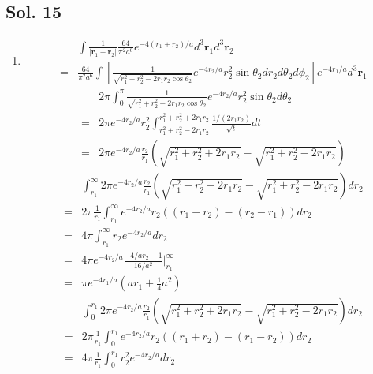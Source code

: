    \subsection*{Sol. 15}
   \begin{enumerate}
       \item 
       \begin{align*}
           &\int\frac{1}{|\bm r_1-\bm r_2|}
           \frac{64}{\pi^2 a^6}e^{-4(r_1+r_2)/a}d^3\bm r_1 d^3\bm r_2\\
           =&\frac{64}{\pi^2 a^6}
           \int\left[\frac{1}{\sqrt{r_1^2+r_2^2-2r_1r_2\cos\theta_2}} e^{-4r_2/a}r_2^2\sin\theta_2
           dr_2d\theta_2d\phi_2
           \right] e^{-4r_1/a}d^3\bm r_1
       \end{align*}
       \begin{align*}
           &2\pi\int_{0}^{\pi}
           \frac{1}{\sqrt{r_1^2+r_2^2-2r_1r_2\cos\theta_2}} e^{-4r_2/a}r_2^2\sin\theta_2
           d\theta_2\\
           =&
           2\pi e^{-4r_2/a}r_2^2\int_{r_1^2+r_2^2-2r_1r_2}^{r_1^2+r_2^2+2r_1r_2} \frac{1/(2r_1r_2)}{\sqrt{t}}dt\\
           =&2\pi e^{-4r_2/a}\frac{r_2}{r_1}
           \left(\sqrt{r_1^2+r_2^2+2r_1r_2} - \sqrt{r_1^2+r_2^2-2r_1r_2}\right)
       \end{align*}
       \begin{align*}
           &\int_{r_1}^{\infty}
           2\pi e^{-4r_2/a}\frac{r_2}{r_1}
           \left(\sqrt{r_1^2+r_2^2+2r_1r_2} - \sqrt{r_1^2+r_2^2-2r_1r_2}\right) dr_2\\
           =&2\pi\frac{1}{r_1}
           \int_{r_1}^{\infty}
           e^{-4r_2/a}r_2
           ((r_1+r_2)-(r_2-r_1))dr_2\\
        =&4\pi\int_{r_1}^{\infty}r_2e^{-4r_2/a}dr_2\\
        =&4\pi e^{-4r_2/a}\frac{-4/ar_2-1}{16/a^2}\bigg|^{\infty}_{r_1}\\
        =&\pi e^{-4r_1/a}(ar_1+\frac{1}{4}a^2)
       \end{align*}
       \begin{align*}
           &\int_{0}^{r_1}
           2\pi e^{-4r_2/a}\frac{r_2}{r_1}
           \left(\sqrt{r_1^2+r_2^2+2r_1r_2} - \sqrt{r_1^2+r_2^2-2r_1r_2}\right) dr_2\\
           =&2\pi\frac{1}{r_1}
           \int_{0}^{r_1}
           e^{-4r_2/a}r_2
           ((r_1+r_2)-(r_1-r_2))dr_2\\
        =&4\pi\frac{1}{r_1}\int_{0}^{r_1}r_2^2e^{-4r_2/a}dr_2\\

\end{align*}
\end{enumerate}
